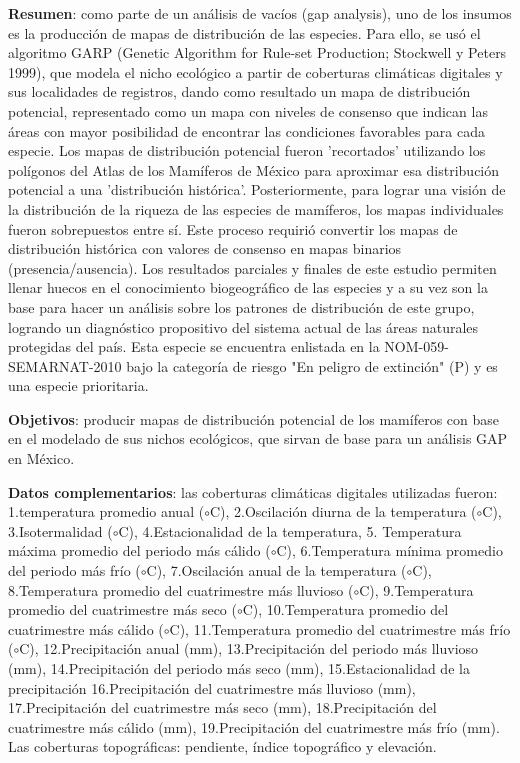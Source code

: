 \documentclass[twoside]{book}
\begin{document}
{\textbf{Resumen}: como parte de un análisis de vacíos (gap analysis), uno de los insumos es
la producción de mapas de distribución de las especies. Para ello, se usó el algoritmo GARP (Genetic Algorithm for Rule-set Production; Stockwell y Peters 1999), que modela el nicho ecológico a partir de coberturas climáticas digitales y sus localidades de registros, dando como resultado un mapa de
distribución potencial, representado como un mapa con niveles de consenso que indican las áreas con mayor posibilidad de encontrar las condiciones favorables para cada especie. Los mapas de distribución potencial fueron 'recortados' utilizando los polígonos del Atlas de los Mamíferos de México
para aproximar esa distribución potencial a una 'distribución histórica'. Posteriormente, para lograr una visión de la distribución de la riqueza de las especies de mamíferos, los mapas individuales fueron sobrepuestos entre sí. Este proceso requirió convertir los mapas de distribución histórica con
valores de consenso en mapas binarios (presencia/ausencia). Los resultados parciales y finales de este estudio permiten llenar huecos en el conocimiento biogeográfico de las especies y a su vez son la base para hacer un análisis sobre los patrones de distribución de este grupo, logrando un diagnóstico
propositivo del sistema actual de las áreas naturales protegidas del país. Esta especie se encuentra enlistada en la NOM-059-SEMARNAT-2010 bajo la categoría de riesgo "En peligro de extinción" (P) y es una especie prioritaria.

\textbf{Objetivos}: producir mapas de distribución potencial de los mamíferos con base en el
modelado de sus nichos ecológicos, que sirvan de base para un análisis GAP en México.

\textbf{Datos complementarios}: las coberturas climáticas digitales utilizadas fueron: 1.temperatura
promedio anual ($\circ$C), 2.Oscilación diurna de la temperatura ($\circ$C), 3.Isotermalidad ($\circ$C), 4.Estacionalidad de la temperatura, 5. Temperatura máxima promedio del periodo más cálido ($\circ$C), 6.Temperatura mínima promedio del periodo más frío ($\circ$C), 7.Oscilación anual de la temperatura
($\circ$C), 8.Temperatura promedio del cuatrimestre más lluvioso ($\circ$C), 9.Temperatura promedio del cuatrimestre más seco ($\circ$C), 10.Temperatura promedio del cuatrimestre más cálido ($\circ$C), 11.Temperatura promedio del cuatrimestre más frío ($\circ$C), 12.Precipitación anual (mm), 13.Precipitación del periodo más lluvioso (mm), 14.Precipitación del periodo más seco (mm), 15.Estacionalidad de la precipitación 16.Precipitación del cuatrimestre más lluvioso (mm), 17.Precipitación del cuatrimestre más seco (mm), 18.Precipitación del cuatrimestre más cálido (mm), 19.Precipitación del
cuatrimestre más frío (mm). Las coberturas topográficas: pendiente, índice
topográfico y elevación.

}
\end{document}
